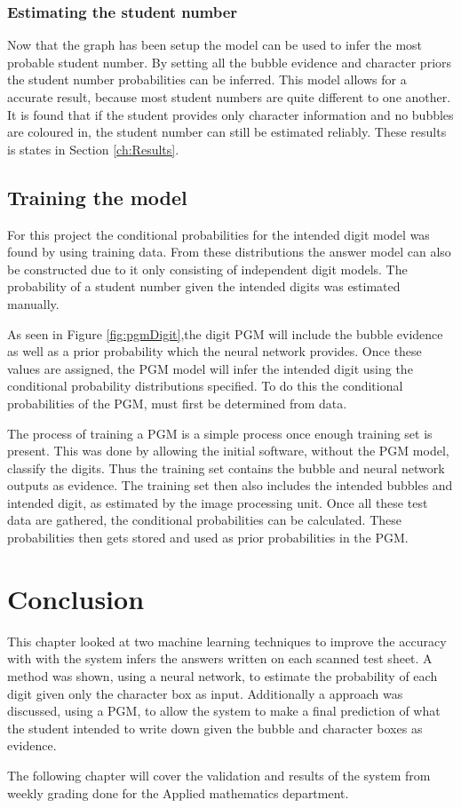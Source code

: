 \subsubsection{Estimating the student number}

Now that the graph has been setup the model can be used to infer the most probable student number. By setting all the bubble evidence and character priors the student number probabilities can be inferred. This model allows for a accurate result, because most student numbers are quite different to one another. It is found that if the student provides only character information and no bubbles are coloured in, the student number can still be estimated reliably. These results is states in Section \ref{ch:Results}.

\subsection{Training the model}

For this project the conditional probabilities for the intended digit model was found by using training data. From these distributions the answer model can also be constructed due to it only consisting of independent digit models. The probability of a student number given the intended digits was estimated manually.

As seen in Figure \ref{fig:pgmDigit},the digit PGM will include the bubble evidence as well as a prior probability which the neural network provides. Once these values are assigned, the PGM model will infer the intended digit using the conditional probability distributions specified. To do this the conditional probabilities of the PGM, must first be determined from data.



The process of training a PGM is a simple process once enough training set is present. This was done by allowing the initial software, without the PGM model, classify the digits. Thus the training set contains the bubble and neural network outputs as evidence. The training set then also includes the intended bubbles and intended digit, as estimated by the image processing unit. Once all these test data are gathered, the conditional probabilities can be calculated. These probabilities then gets stored and used as prior probabilities in the PGM.

\section{Conclusion}

This chapter looked at two machine learning techniques to improve the accuracy with with the system infers the answers written on each scanned test sheet. A method was shown, using a neural network, to estimate the probability of each digit given only the character box as input. Additionally a approach was discussed, using a PGM, to allow the system to make a final prediction of what the student intended to write down given the bubble and character boxes as evidence.

The following chapter will cover the validation and results of the system from weekly grading done for the Applied mathematics department.